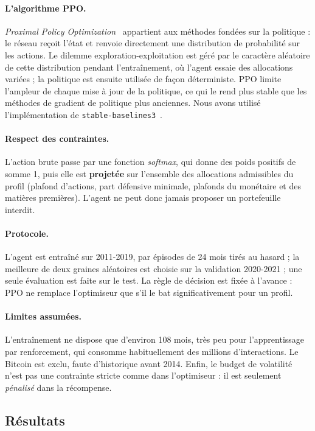 \paragraph{L'algorithme PPO.} \emph{Proximal Policy Optimization}~\cite{schulman2017} appartient aux méthodes fondées sur la politique : le réseau reçoit l'état et renvoie directement une distribution de probabilité sur les actions. Le dilemme exploration-exploitation est géré par le caractère aléatoire de cette distribution pendant l'entraînement, où l'agent essaie des allocations variées ; la politique est ensuite utilisée de façon déterministe. PPO limite l'ampleur de chaque mise à jour de la politique, ce qui le rend plus stable que les méthodes de gradient de politique plus anciennes. Nous avons utilisé l'implémentation de \texttt{stable-baselines3}~\cite{raffin2021}.

\paragraph{Respect des contraintes.} L'action brute passe par une fonction \emph{softmax}, qui donne des poids positifs de somme 1, puis elle est \textbf{projetée} sur l'ensemble des allocations admissibles du profil (plafond d'actions, part défensive minimale, plafonds du monétaire et des matières premières). L'agent ne peut donc jamais proposer un portefeuille interdit.

\paragraph{Protocole.} L'agent est entraîné sur 2011-2019, par épisodes de 24 mois tirés au hasard ; la meilleure de deux graines aléatoires est choisie sur la validation 2020-2021 ; une seule évaluation est faite sur le test. La règle de décision est fixée à l'avance : PPO ne remplace l'optimiseur que s'il le bat significativement pour un profil.

\paragraph{Limites assumées.} L'entraînement ne dispose que d'environ 108 mois, très peu pour l'apprentissage par renforcement, qui consomme habituellement des millions d'interactions. Le Bitcoin est exclu, faute d'historique avant 2014. Enfin, le budget de volatilité n'est pas une contrainte stricte comme dans l'optimiseur : il est seulement \emph{pénalisé} dans la récompense.

\subsection{Résultats}

